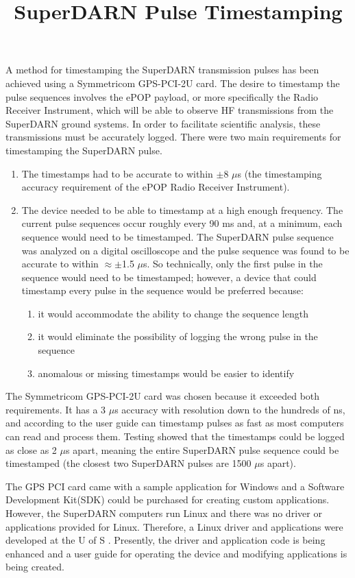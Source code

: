 \documentclass[11pt]{article}
\title{SuperDARN Pulse Timestamping}
\begin{document}
\maketitle

A method for timestamping the SuperDARN transmission pulses has been achieved using a Symmetricom GPS-PCI-2U card.
The desire to timestamp the pulse sequences involves the ePOP payload, or more specifically the Radio Receiver Instrument,
which will be able to observe HF transmissions from the SuperDARN ground systems.
In order to facilitate scientific analysis, these transmissions must be accurately logged.
There were two main requirements for timestamping the SuperDARN pulse.
\begin{enumerate}
 \item The timestamps had to be accurate to within $\pm$8 $\mu$s (the timestamping accuracy requirement of the ePOP Radio Receiver Instrument).
 \item The device needed to be able to timestamp at a high enough frequency.
 The current pulse sequences occur roughly every 90 ms and, at a minimum, each sequence would need to be timestamped.
 The SuperDARN pulse sequence was analyzed on a digital oscilloscope and the pulse sequence was found to be accurate to within $\approx \pm$1.5 $\mu$s.
 So technically, only the first pulse in the sequence would need to be timestamped;
 however, a device that could timestamp every pulse in the sequence would be preferred because:
  \begin{enumerate}
   \item it would accommodate the ability to change the sequence length
   \item it would eliminate the possibility of logging the wrong pulse in the sequence
   \item anomalous or missing timestamps would be easier to identify
  \end{enumerate}
\end{enumerate}

The Symmetricom GPS-PCI-2U card was chosen because it exceeded both requirements.
It has a 3 $\mu$s accuracy with resolution down to the hundreds of ns, and according to the user guide can
timestamp pulses as fast as most computers can read and process them.
Testing showed that the timestamps could be logged as close as 2 $\mu$s apart,
meaning the entire SuperDARN pulse sequence could be timestamped (the closest two SuperDARN pulses are 1500 $\mu$s apart).

The GPS PCI card came with a sample application for Windows and a Software Development Kit(SDK) could
be purchased for creating custom applications.
However, the SuperDARN computers run Linux and there was no driver or applications provided for Linux.
Therefore, a Linux driver and applications were developed at the U of S .
Presently, the driver and application code is being enhanced and a user guide for operating the device and modifying applications is being created.
\end{document}
